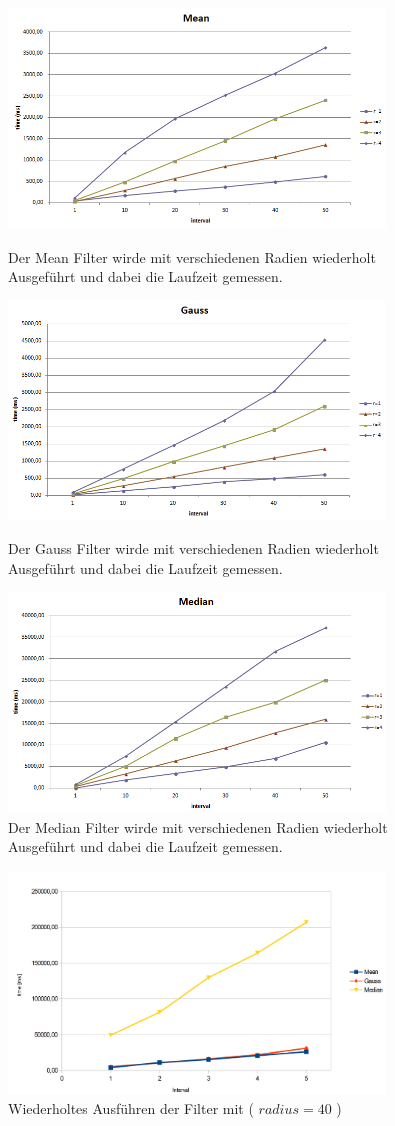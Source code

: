 \documentclass[12pt,german]{article}
\begin{document}
\begin{figure} [h!]
  \centering
  \includegraphics[width=10cm]{TimeEvaluationGraph_Mean.png}
  \caption{Der Mean Filter wirde mit verschiedenen Radien wiederholt Ausgeführt und dabei die Laufzeit gemessen.}
  \includegraphics[width=10cm]{TimeEvaluationGraph_Gauss.png}
  \caption{Der Gauss Filter wirde mit verschiedenen Radien wiederholt Ausgeführt und dabei die Laufzeit gemessen.}
  \includegraphics[width=10cm]{TimeEvaluationGraph_Median.png}
  \caption{Der Median Filter wirde mit verschiedenen Radien wiederholt Ausgeführt und dabei die Laufzeit gemessen.}
\end{figure}
\begin{figure} [h!]
  \centering
  \includegraphics[width=10cm]{TimeEvaluationGraph_allBig.png}
  \caption{Wiederholtes Ausführen der Filter mit  ( $ radius = 40 $ )}
\end{figure}
\end{document}
